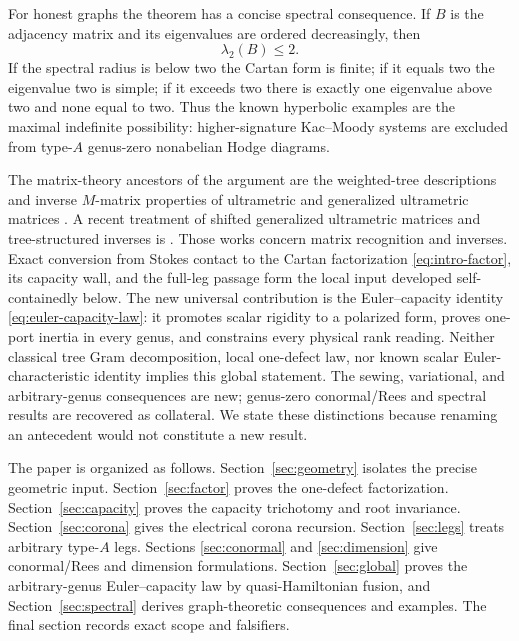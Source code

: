 \documentclass[11pt,a4paper]{amsart}
\theoremstyle{plain}
\theoremstyle{definition}
\begin{document}
For honest graphs the theorem has a concise spectral consequence.  If $B$ is the adjacency matrix
and its eigenvalues are ordered decreasingly, then
\[
                         \lambda_2(B)\le2.
\]
If the spectral radius is below two the Cartan form is finite; if it equals two the eigenvalue two
is simple; if it exceeds two there is exactly one eigenvalue above two and none equal to two.  Thus
the known hyperbolic examples are the maximal indefinite possibility: higher-signature
Kac--Moody systems are excluded from type-$A$ genus-zero nonabelian Hodge diagrams.

The matrix-theory ancestors of the argument are the weighted-tree descriptions and inverse
$M$-matrix properties of ultrametric and generalized ultrametric matrices
\cite{MartinezMichonSanMartin1994,McDonaldEtAl1995,NabbenVarga1995}.  A recent treatment of shifted
generalized ultrametric matrices and tree-structured inverses is \cite{Nabben2026Acyclic}.  Those
works concern matrix recognition and inverses.  Exact conversion from Stokes contact to the Cartan
factorization \eqref{eq:intro-factor}, its capacity wall, and the full-leg passage form the local
input developed self-containedly below.  The new universal
contribution is the Euler--capacity identity \eqref{eq:euler-capacity-law}: it promotes scalar
rigidity to a polarized form, proves one-port inertia in every genus, and constrains every physical
rank reading.  Neither classical tree Gram decomposition, local one-defect law, nor known scalar
Euler-characteristic identity implies this global statement.  The sewing, variational, and
arbitrary-genus consequences are new; genus-zero conormal/Rees and spectral results are recovered
as collateral.  We state these distinctions because renaming an antecedent would not constitute a
new result.

The paper is organized as follows.  Section~\ref{sec:geometry} isolates the precise geometric
input.  Section~\ref{sec:factor} proves the one-defect factorization.  Section~\ref{sec:capacity}
proves the capacity trichotomy and root invariance.  Section~\ref{sec:corona} gives the electrical
corona recursion.  Section~\ref{sec:legs} treats arbitrary type-$A$ legs.  Sections
\ref{sec:conormal} and \ref{sec:dimension} give conormal/Rees and dimension formulations.
Section~\ref{sec:global} proves the arbitrary-genus Euler--capacity law by quasi-Hamiltonian
fusion, and
Section~\ref{sec:spectral} derives graph-theoretic consequences and examples.  The final section
records exact scope and falsifiers.
\end{document}
